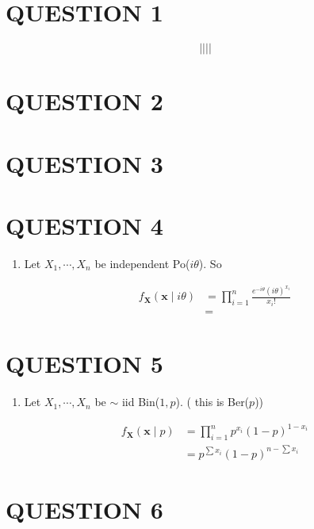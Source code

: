 \documentclass[a4paper]{article}
\begin{document}
	
\maketitle

\section{QUESTION 1}

\[ | \left|  \right| |  \]

\section{QUESTION 2}
\section{QUESTION 3}
\section{QUESTION 4}

\begin{enumerate}[label = (\alph*)]
	\item Let $ X_{1},\cdots,X_{n} $ be independent Po($ i\theta $). So
	
	\begin{align*}
	f_{\mathbf{X}}(\mathbf{x} \; | \; i\theta) & =  \prod_{i=1}^{n} \frac{e^{-i\theta}(i \theta)^{x_{i}}}{x_{i}!} \\
	& = 
	\end{align*}
\end{enumerate}

\section{QUESTION 5}

\begin{enumerate}[label = (\alph*)]
	\item Let $ X_{1},\cdots,X_{n} $ be $ \sim $ iid Bin($ 1,p $). ( this is Ber($ p $))
	
	\begin{align*}
	f_{\mathbf{X}}(\mathbf{x} \; | \; p) & =  \prod_{i=1}^{n} p^{x_{i}}(1-p)^{1-x_{i}} \\
	& = p^{\sum x_{i}} (1-p)^{n- \sum x_{i}}
	\end{align*}
\end{enumerate}



\section{QUESTION 6}
\end{document}
